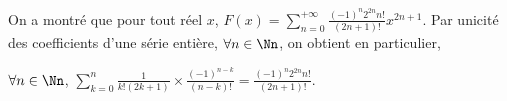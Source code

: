 {{On a montré que pour tout réel $x$, $F(x)=\sum_{n=0}^{+\infty}\frac{(-1)^n2^{2n}n!}{(2n+1)!}x^{2n+1}$. Par unicité des coefficients d'une série entière, $\forall n\in\Nn$, on obtient en particulier,

\begin{center}
$\forall n\in\Nn$, $\sum_{k=0}^{n}\frac{1}{k!(2k+1)}\times\frac{(-1)^{n-k}}{(n-k)!}=\frac{(-1)^n2^{2n}n!}{(2n+1)!}$.
\end{center}
}
}
